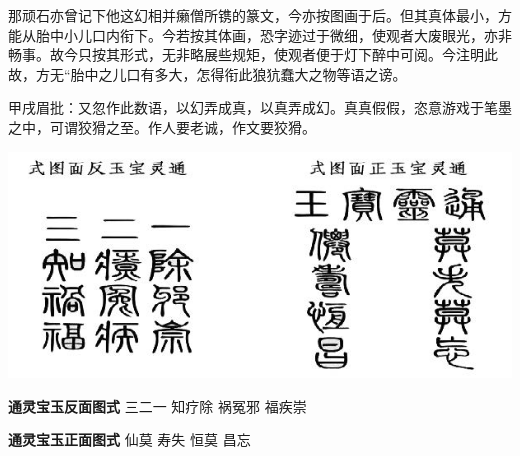 

\begin{parag}
    那顽石亦曾记下他这幻相并癞僧所镌的篆文，今亦按图画于后。但其真体最小，方能从胎中小儿口内衔下。今若按其体画，恐字迹过于微细，使观者大废眼光，亦非畅事。故今只按其形式，无非略展些规矩，使观者便于灯下醉中可阅。今注明此故，方无“胎中之儿口有多大，怎得衔此狼犺蠢大之物等语之谤。\begin{note}甲戌眉批：又忽作此数语，以幻弄成真，以真弄成幻。真真假假，恣意游戏于笔墨之中，可谓狡猾之至。作人要老诚，作文要狡猾。\end{note}
\end{parag}

\includegraphics{8-1}

\begin{parag}\textbf{通灵宝玉反面图式} \newline
    \indent 三二一\newline
    \indent 知疗除\newline
    \indent 祸冤邪\newline
    \indent 福疾崇\newline
\end{parag}


\begin{parag}
    \textbf{通灵宝玉正面图式}\newline
    \indent 仙莫\newline
    \indent 寿失\newline
    \indent 恒莫\newline
    \indent 昌忘\newline
\end{parag}


